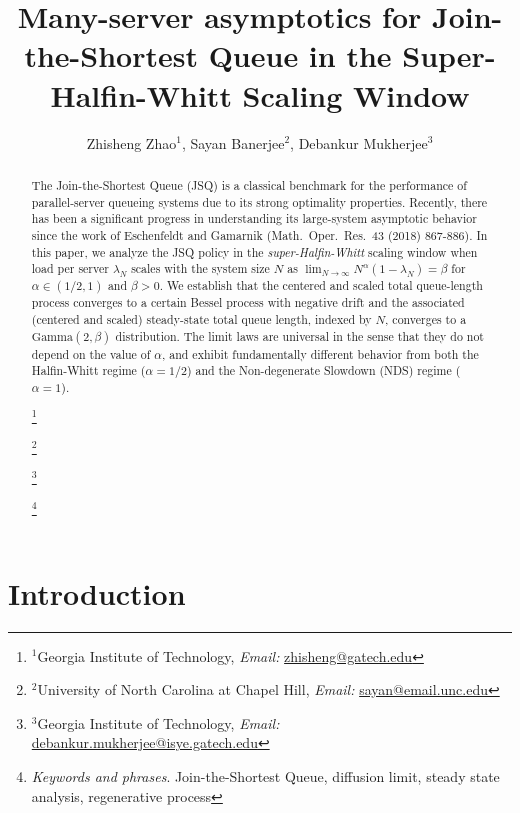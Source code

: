 \documentclass[11pt, reqno]{article}
\title{Many-server asymptotics for Join-the-Shortest Queue in the Super-Halfin-Whitt Scaling Window}
\numberwithin{equation}{section}
\numberwithin{theorem}{section}
\newcommand\blfootnote[1]{%
  \begingroup
  \renewcommand\thefootnote{}\footnote{#1}%
  \addtocounter{footnote}{-1}%
  \endgroup
}
\begin{document}
\author{
  Zhisheng Zhao$^1$, Sayan Banerjee$^2$, Debankur Mukherjee$^3$
}
\renewcommand\Authands{, }
\maketitle
\begin{abstract}
The Join-the-Shortest Queue (JSQ) is a classical benchmark for the performance of parallel-server queueing systems due to its strong optimality properties. Recently, there has been a significant progress in understanding its large-system asymptotic behavior since the work of Eschenfeldt and Gamarnik (Math.~Oper.~Res.~43 (2018) 867-886). In this paper, we analyze the JSQ policy in the \emph{super-Halfin-Whitt} scaling window when load per server $\lambda_N$ scales with the system size $N$ as $\lim_{N\rightarrow\infty}N^{\alpha}(1-\lambda_N)=\beta$ for $\alpha\in(1/2,1)$ and $\beta>0$. We establish that the centered and scaled total queue-length process converges to a certain Bessel process with negative drift and the associated (centered and scaled) steady-state total queue length, indexed by $N$, converges to a $\mathrm{Gamma}(2,\beta)$ distribution. The limit laws are universal in the sense that they do not depend on the value of $\alpha$, and exhibit fundamentally different behavior from both the Halfin-Whitt regime ($\alpha=1/2$) and the Non-degenerate Slowdown (NDS) regime ($\alpha=1$).

   \blfootnote{$^1$Georgia Institute of Technology, \emph{Email:} \href{mailto:zhisheng@gatech.edu}{zhisheng@gatech.edu}}
\blfootnote{$^2$University of North Carolina at Chapel Hill, \emph{Email:} \href{mailto:sayan@email.unc.edu}{sayan@email.unc.edu}}
\blfootnote{$^3$Georgia Institute of Technology, \emph{Email:}  \href{mailto:debankur.mukherjee@isye.gatech.edu}{debankur.mukherjee@isye.gatech.edu}}
\blfootnote{\emph{Keywords and phrases}. Join-the-Shortest Queue, diffusion limit, steady state analysis, regenerative process }
\end{abstract}







\section{Introduction}\label{sec:INTRODUCTION}
\end{document}
